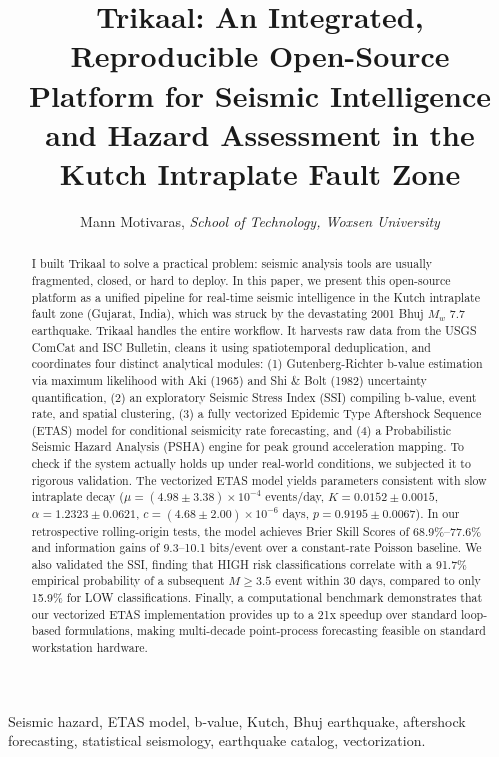 \documentclass[journal]{IEEEtran}
\begin{document}
\title{Trikaal: An Integrated, Reproducible Open-Source Platform for Seismic Intelligence and Hazard Assessment in the Kutch Intraplate Fault Zone}
\author{Mann Motivaras, \textit{School of Technology, Woxsen University}}
\maketitle

\begin{abstract}
I built Trikaal to solve a practical problem: seismic analysis tools are usually fragmented, closed, or hard to deploy. In this paper, we present this open-source platform as a unified pipeline for real-time seismic intelligence in the Kutch intraplate fault zone (Gujarat, India), which was struck by the devastating 2001 Bhuj $M_w$ 7.7 earthquake. Trikaal handles the entire workflow. It harvests raw data from the USGS ComCat and ISC Bulletin, cleans it using spatiotemporal deduplication, and coordinates four distinct analytical modules: (1) Gutenberg-Richter b-value estimation via maximum likelihood with Aki (1965) and Shi \& Bolt (1982) uncertainty quantification, (2) an exploratory Seismic Stress Index (SSI) compiling b-value, event rate, and spatial clustering, (3) a fully vectorized Epidemic Type Aftershock Sequence (ETAS) model for conditional seismicity rate forecasting, and (4) a Probabilistic Seismic Hazard Analysis (PSHA) engine for peak ground acceleration mapping. To check if the system actually holds up under real-world conditions, we subjected it to rigorous validation. The vectorized ETAS model yields parameters consistent with slow intraplate decay ($\mu = (4.98 \pm 3.38) \times 10^{-4}$ events/day, $K = 0.0152 \pm 0.0015$, $\alpha = 1.2323 \pm 0.0621$, $c = (4.68 \pm 2.00) \times 10^{-6}$ days, $p = 0.9195 \pm 0.0067$). In our retrospective rolling-origin tests, the model achieves Brier Skill Scores of 68.9\%–77.6\% and information gains of 9.3–10.1 bits/event over a constant-rate Poisson baseline. We also validated the SSI, finding that HIGH risk classifications correlate with a 91.7\% empirical probability of a subsequent $M \ge 3.5$ event within 30 days, compared to only 15.9\% for LOW classifications. Finally, a computational benchmark demonstrates that our vectorized ETAS implementation provides up to a 21x speedup over standard loop-based formulations, making multi-decade point-process forecasting feasible on standard workstation hardware.
\end{abstract}

\begin{IEEEkeywords}
Seismic hazard, ETAS model, b-value, Kutch, Bhuj earthquake, aftershock forecasting, statistical seismology, earthquake catalog, vectorization.
\end{IEEEkeywords}
\end{document}
